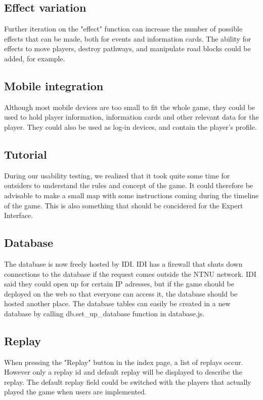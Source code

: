 \subsection{Effect variation}
Further iteration on the "effect" function can increase the number of possible effects that can be made, both for events and information cards. The ability for effects to move players, destroy pathways, and manipulate road blocks could be added, for example.\\

\subsection{Mobile integration}
Although most mobile devices are too small to fit the whole game, they could be used to hold player information, information cards and other relevant data for the player. They could also be used as log-in devices, and contain the player's profile.

\subsection{Tutorial} 
During our usability testing, we realized that it took quite some time for outsiders to understand the rules and concept of the game. It could therefore be advisable to make a small map with some instructions coming during the timeline of the game. This is also something that should be concidered for the Expert Interface. 

\subsection{Database}
The database is now freely hosted by IDI. IDI has a firewall that shuts down connections to the database if the request comes outside the NTNU network. IDI said they could open up for certain IP adresses, but if the game should be deployed on the web so that everyone can access it, the database should be hosted another place. The database tables can easily be created in a new database by calling db.set\_up\_database function in database.js.

\subsection{Replay}
When pressing the "Replay" button in the index page, a list of replays occur. However only a replay id and default replay will be displayed to describe the replay. The default replay field could be switched with the players that actually played the game when users are implemented.
